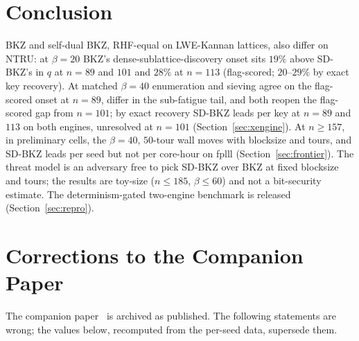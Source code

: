 \documentclass[journal=cic,version=preprint]{iacrj}
\begin{document}
\section{Conclusion}
\label{sec:conclusion}
BKZ and self-dual BKZ, RHF-equal on LWE-Kannan lattices, also differ on
NTRU: at $\beta=20$ BKZ's dense-sublattice-discovery onset sits $19\%$
above SD-BKZ's in $q$ at $n=89$ and $101$ and $28\%$ at $n=113$
(flag-scored; $20$--$29\%$ by exact key recovery). At matched $\beta=40$
enumeration and sieving agree on the flag-scored onset at $n=89$, differ in
the sub-fatigue tail, and both reopen the flag-scored gap from $n=101$; by
exact recovery SD-BKZ leads per key at $n=89$ and $113$ on both engines, unresolved
at $n=101$ (Section~\ref{sec:xengine}). At $n\ge157$, in
preliminary cells, the $\beta=40$, $50$-tour wall moves with blocksize and
tours, and SD-BKZ leads per seed but not per core-hour on fplll
(Section~\ref{sec:frontier}). The threat model is an adversary free to pick
SD-BKZ over BKZ at fixed blocksize and tours; the results are toy-size
($n\le185$, $\beta\le60$) and not a bit-security estimate. The
determinism-gated two-engine benchmark is released (Section~\ref{sec:repro}).

\appendix

\section{Corrections to the Companion Paper}
\label{sec:p1corr}

The companion paper~\cite{Paper1} is archived as published. The following
statements are wrong; the values below, recomputed from the per-seed data,
supersede them.
\end{document}
